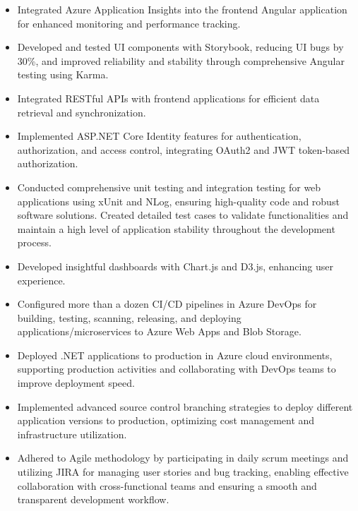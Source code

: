\documentclass{article}
\begin{document}
\begin{itemize}[leftmargin=15pt, itemsep=-5pt]
  \item Integrated Azure Application Insights into the frontend Angular application for enhanced monitoring and performance tracking.
  \item Developed and tested UI components with Storybook, reducing UI bugs by 30\%, and improved reliability and stability through comprehensive Angular testing using Karma.
  \item Integrated RESTful APIs with frontend applications for efficient data retrieval and synchronization.
  \item Implemented ASP.NET Core Identity features for authentication, authorization, and access control, integrating OAuth2 and JWT token-based authorization.
  \item Conducted comprehensive unit testing and integration testing for web applications using xUnit and NLog, ensuring high-quality code and robust software solutions. Created detailed test cases to validate functionalities and maintain a high level of application stability throughout the development process.
  \item Developed insightful dashboards with Chart.js and D3.js, enhancing user experience.
  \item Configured more than a dozen CI/CD pipelines in Azure DevOps for building, testing, scanning, releasing, and deploying applications/microservices to Azure Web Apps and Blob Storage.
  \item Deployed .NET applications to production in Azure cloud environments, supporting production activities and collaborating with DevOps teams to improve deployment speed.
  \item Implemented advanced source control branching strategies to deploy different application versions to production, optimizing cost management and infrastructure utilization.
  \item Adhered to Agile methodology by participating in daily scrum meetings and utilizing JIRA for managing user stories and bug tracking, enabling effective collaboration with cross-functional teams and ensuring a smooth and transparent development workflow.
\end{itemize}
\end{document}
